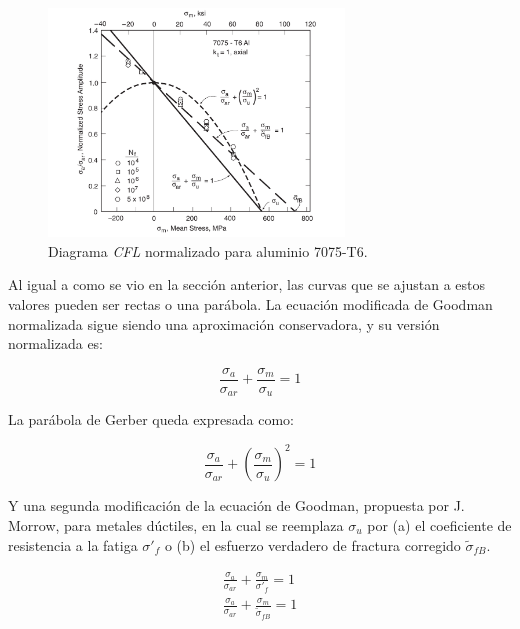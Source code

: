 \begin{figure}[h]
\centering
\includegraphics[width=0.7\textwidth]{Imagenes/cfl_norm.pdf}
\caption{Diagrama \textit{CFL} normalizado para aluminio 7075-T6. \cite{dowling2013mechanical}}
\label{fig:cfl_norm}
\end{figure}

Al igual a como se vio en la sección anterior, las curvas que se ajustan a estos valores pueden ser rectas o una parábola. La ecuación modificada de Goodman normalizada sigue siendo una aproximación conservadora, y su versión normalizada es:

\begin{equation} \label{eq:good_norm}
	\frac{\sigma_a}{\sigma_{ar}} + \frac{\sigma_m}{\sigma_u} = 1 
\end{equation}

La parábola de Gerber queda expresada como:

\begin{equation} \label{eq:par_gerber}
	\frac{\sigma_a}{\sigma_{ar}} + \left(\frac{\sigma_m}{\sigma_u}\right)^2 = 1 
\end{equation}

Y una segunda modificación de la ecuación de Goodman, propuesta por J. Morrow, para metales dúctiles, en la cual se reemplaza $\sigma_u$ por (a) el coeficiente de resistencia a la fatiga $\sigma'_f$ o (b) el esfuerzo verdadero de fractura corregido $\tilde{\sigma}_{fB}$. 

\begin{subequations}
\begin{gather}
	\frac{\sigma_a}{\sigma_{ar}} + \frac{\sigma_m}{\sigma'_f} = 1  \label{eq:good_a}\\
	\frac{\sigma_a}{\sigma_{ar}} + \frac{\sigma_m}{\tilde{\sigma}_{fB}} = 1 \label{good_b}
\end{gather}
\end{subequations}

